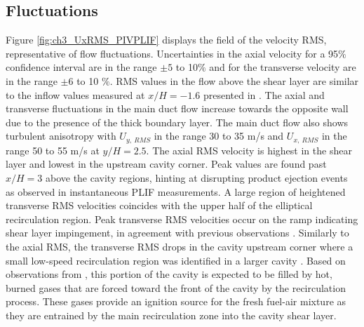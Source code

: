 \subsection*{Fluctuations}
Figure \ref{fig:ch3_UxRMS_PIVPLIF} displays the field of the velocity RMS, representative of flow fluctuations.  Uncertainties in the axial velocity for a 95$\%$ confidence interval are in the range $\pm5$ to 10$\%$ and for the transverse velocity are in the range $\pm6$ to 10 $\%$.  RMS values in the flow above the shear layer are similar to the inflow values measured at $x/H=-1.6$ presented in \cite{LieberThesis}. The axial and transverse fluctuations in the main duct flow increase towards the opposite wall due to the presence of the thick boundary layer. The main duct flow also shows turbulent anisotropy with $U_{y,~ RMS}$ in the range 30 to 35 m/s and $U_{x,~ RMS}$ in the range 50 to 55 m/s at $y/H=2.5$. 
The axial RMS velocity is highest in the shear layer and lowest in the upstream cavity corner. Peak values are found past $x/H=3$ above the cavity regions, hinting at disrupting product ejection events as observed in instantaneous PLIF measurements. 
A large region of heightened transverse RMS velocities coincides with the upper half of the elliptical recirculation region. Peak transverse RMS velocities occur on the ramp indicating shear layer impingement, in agreement with previous observations \citep{Kirik2017}. Similarly to the axial RMS, the transverse RMS drops in the cavity upstream corner where a small low-speed recirculation region was identified in a larger cavity \citep{Kirik2017}. Based on observations from \citet{Kirik2017}, this portion of the cavity is expected to be filled by hot, burned gases that are forced toward the front of the cavity by the recirculation process. These gases provide an ignition source for the fresh fuel-air mixture as they are entrained by the main recirculation zone into the cavity shear layer.

